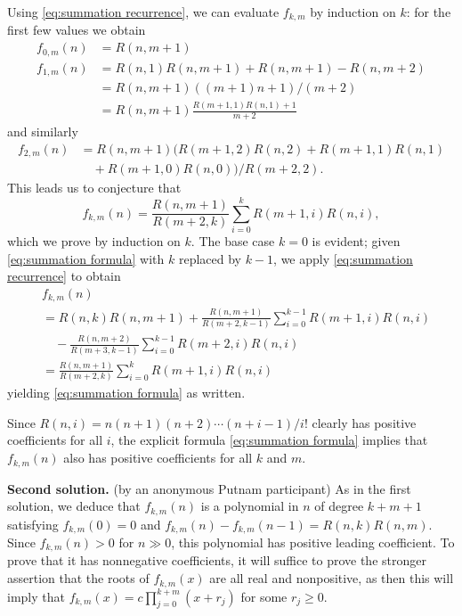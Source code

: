 \documentclass[amssymb,twocolumn,pra,10pt,aps]{revtex4-1}
\begin{document}
\begin{itemize}
Using \eqref{eq:summation recurrence}, we can evaluate $f_{k,m}$ by induction on $k$: for the first few values we obtain
\begin{align*}
f_{0,m}(n) &= R(n,m+1) \\
f_{1,m}(n) &= R(n,1)R(n,m+1) + R(n,m+1) - R(n,m+2) \\
           & = R(n,m+1)((m+1)n+1)/(m+2) \\
           & = R(n,m+1) \frac{R(m+1,1)R(n,1)+1}{m+2}
\end{align*}
and similarly
\begin{align*}
f_{2,m}(n) &= R(n,m+1) (R(m+1,2)R(n,2) + R(m+1,1)R(n,1) \\
&\quad +R(m+1,0)R(n,0))/R(m+2,2).
\end{align*}
This leads us to conjecture that
\begin{equation} \label{eq:summation formula}
f_{k,m}(n) = \frac{R(n,m+1)}{R(m+2,k)} \sum_{i=0}^k R(m+1,i)R(n,i),
\end{equation}
which we prove by induction on $k$.
The base case $k=0$ is evident;
given \eqref{eq:summation formula} with $k$ replaced by $k-1$,
we apply \eqref{eq:summation recurrence} to obtain
\begin{align*}
&f_{k,m}(n) \\
&= R(n,k) R(n,m+1) + \frac{R(n,m+1)}{R(m+2,k-1)} \sum_{i=0}^{k-1} R(m+1,i)R(n,i)\\
&\quad - \frac{R(n,m+2)}{R(m+3,k-1)} \sum_{i=0}^{k-1} R(m+2,i)R(n,i) \\
&= \frac{R(n,m+1)}{R(m+2,k)} \sum_{i=0}^k R(m+1,i)R(n,i)
\end{align*}
yielding \eqref{eq:summation formula} as written.

Since $R(n,i) = n(n+1)(n+2)\cdots (n+i-1)/i!$ clearly has positive coefficients for all $i$, the explicit formula \eqref{eq:summation formula} implies that $f_{k,m}(n)$ also has positive coefficients for all $k$ and $m$.

\noindent
\textbf{Second solution.} 
(by an anonymous Putnam participant)
As in the first solution, we deduce that $f_{k,m}(n)$ is a polynomial in $n$ of degree $k+m+1$
satisfying $f_{k,m}(0) = 0$ and $f_{k,m}(n) - f_{k,m}(n-1) = R(n,k)R(n,m)$.
Since $f_{k,m}(n) > 0$ for $n \gg 0$, this polynomial has positive leading coefficient.
To prove that it has nonnegative coefficients, it will suffice to prove the stronger assertion that the roots of $f_{k,m}(x)$ are all real and nonpositive, as then this will imply that $f_{k,m}(x) = c \prod_{j=0}^{k+m} (x + r_j)$ for some $r_j \geq 0$.


\end{itemize}
\end{document}
